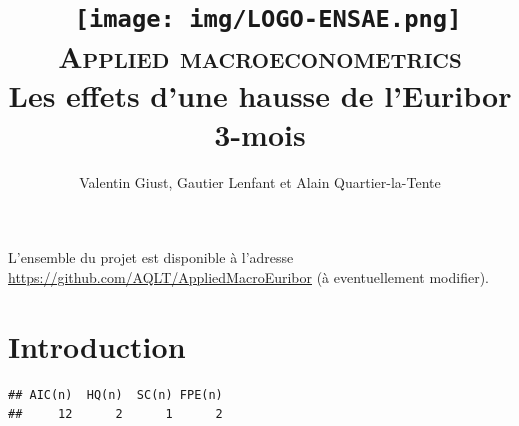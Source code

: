 \documentclass[
  10pt,
  ,
  french,
  a4paper]{article}
\title{~\texttt{[image: img/LOGO-ENSAE.png]}\\
\hspace*{0.333em}\textsc{Applied macroeconometrics}\\
\hspace*{0.333em}Les effets d'une hausse de l'Euribor 3-mois}
\author{Valentin Giust, Gautier Lenfant et Alain Quartier-la-Tente}
\date{}
\newenvironment{Shaded}{\begin{snugshade}}{\end{snugshade}}
\newcommand{\AttributeTok}[1]{\textcolor[rgb]{0.77,0.63,0.00}{#1}}
\newcommand{\CommentTok}[1]{\textcolor[rgb]{0.56,0.35,0.01}{\textit{#1}}}
\newcommand{\DecValTok}[1]{\textcolor[rgb]{0.00,0.00,0.81}{#1}}
\newcommand{\FunctionTok}[1]{\textcolor[rgb]{0.00,0.00,0.00}{#1}}
\newcommand{\NormalTok}[1]{#1}
\newcommand{\OtherTok}[1]{\textcolor[rgb]{0.56,0.35,0.01}{#1}}
\newcommand{\SpecialCharTok}[1]{\textcolor[rgb]{0.00,0.00,0.00}{#1}}
\newcommand{\StringTok}[1]{\textcolor[rgb]{0.31,0.60,0.02}{#1}}
\begin{document}
\maketitle

{
\setcounter{tocdepth}{2}
\tableofcontents
}
\vfill

L'ensemble du projet est disponible à l'adresse \url{https://github.com/AQLT/AppliedMacroEuribor} (à eventuellement modifier).

\newpage

\hypertarget{introduction}{%
\section*{Introduction}\label{introduction}}

\begin{Shaded}
\end{Shaded}

\begin{verbatim}
## AIC(n)  HQ(n)  SC(n) FPE(n) 
##     12      2      1      2
\end{verbatim}
\end{document}
